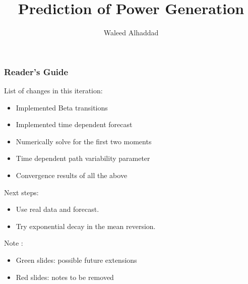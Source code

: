 \documentclass[aspectratio=169]{beamer}\usepackage[utf8]{inputenc}
\title{Prediction of Power Generation}
\subtitle{ Waleed Alhaddad}
\begin{document}
\begin{frame}
\titlepage
\end{frame}
%
%
%
%


\begin{frame}[label=guide]\frametitle{ Reader's Guide }

List of changes in this iteration:
\begin{itemize}
\item Implemented Beta transitions
\item Implemented time dependent forecast
\item Numerically solve for the first two moments
\item Time dependent path variability parameter
\item Convergence results of all the above
\end{itemize}

Next steps:
\begin{itemize}
\item Use real data and forecast.
\item Try exponential decay in the mean reversion.
\end{itemize}

Note :
\begin{itemize}
\item Green slides: possible future extensions
\item Red slides: notes to be removed
\end{itemize}

\end{frame}
\end{document}
